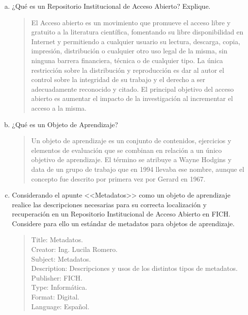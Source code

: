 \documentclass[a4paper,12pt,oneside,final,spanish]{article}
\begin{document}
\begin{enumerate}[a.]
\item ¿Qué es un Repositorio Institucional de Acceso Abierto? Explique.

\begin{quote}
El Acceso abierto es un movimiento que promueve el acceso libre y gratuito a la literatura científica, fomentando su libre disponibilidad en Internet y permitiendo a cualquier usuario su lectura, descarga, copia, impresión, distribución o cualquier otro uso legal de la misma, sin ninguna barrera financiera, técnica o de cualquier tipo. La única restricción sobre la distribución y reproducción es dar al autor el control sobre la integridad de su trabajo y el derecho a ser adecuadamente reconocido y citado.
El principal objetivo del acceso abierto es aumentar el impacto de la investigación al incrementar el acceso a la misma.
\end{quote}

\item ¿Qué es un Objeto de Aprendizaje?

\begin{quote}
Un objeto de aprendizaje es un conjunto de contenidos, ejercicios y elementos de evaluación que se combinan en relación a un único objetivo de aprendizaje. El término se atribuye a Wayne Hodgins y data de un grupo de trabajo que en 1994 llevaba ese nombre, aunque el concepto fue descrito por primera vez por Gerard en 1967.
\end{quote}

\item Considerando el apunte <<Metadatos>> como un objeto de aprendizaje realice las descripciones necesarias para su correcta localización y recuperación en un Repositorio Institucional de Acceso Abierto en FICH. Considere para ello un estándar de metadatos para objetos de aprendizaje.

\begin{quote}
Title: Metadatos.\\
Creator: Ing. Lucila Romero.\\
Subject: Metadatos.\\
Description: Descripciones y usos de los distintos tipos de metadatos.\\
Publisher: FICH.\\
Type: Informática.\\ 
Format:  Digital. \\
Language: Español. 
\end{quote}


\end{enumerate}
\end{document}
